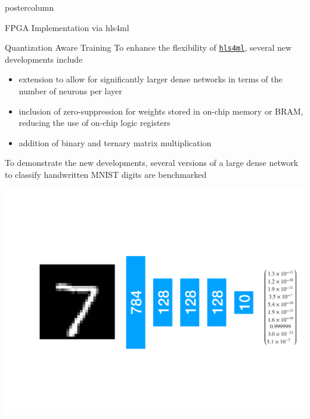 \documentclass[final,hyperref={pdfpagelabels=false}]{beamer}
\newcommand{\hlsfml}{{\href{https://github.com/hls-fpga-machine-learning/hls4ml}{\texttt{hls4ml}}}}
\begin{document}
\begin{frame}
\begin{columns}
\begin{column}{.49\textwidth}
\begin{beamercolorbox}[center,wd=\textwidth]{postercolumn}
\begin{minipage}[T]{.95\textwidth}
{\begin{block}{FPGA Implementation via hls4ml}
            \end{block}
                  \begin{block}{Quantization Aware Training}
                    To enhance the flexibility of \hlsfml, several new
                    developments include
                    \begin{itemize}
                    \item extension to allow for
                      significantly larger dense networks in terms of the number of neurons per layer
                    \item inclusion of zero-suppression for weights
                      stored in on-chip memory or BRAM, reducing the use of on-chip logic registers
                    \item addition of binary and ternary matrix multiplication
                    \end{itemize}
                \vspace{0.5in}
                    To demonstrate the new developments, several versions of a large dense network to classify handwritten MNIST digits are benchmarked
                    \begin{center}
                    \includegraphics[width=\linewidth]{MNIST_big.pdf}
                  \end{center}
                  \begin{center}
\end{center}
\end{block}}
\end{minipage}
\end{beamercolorbox}
\end{column}
\end{columns}
\end{frame}
\end{document}
